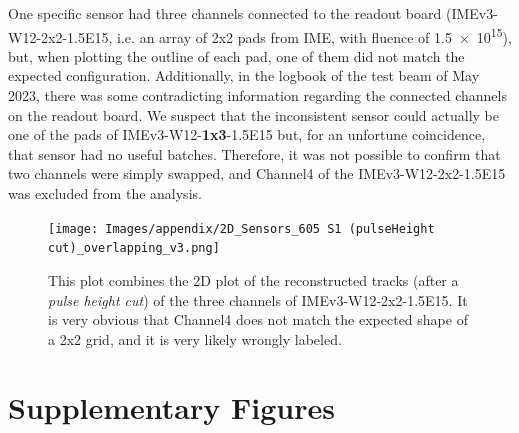 One specific sensor had three channels connected to the readout board (IMEv3-W12-2x2-1.5E15, i.e. an array of 2x2 pads from IME, with fluence of \qty{1.5e15}{\neutroneq}), but, when plotting the outline of each pad, one of them did not match the expected configuration. Additionally, in the logbook of the test beam of May 2023, there was some contradicting information regarding the connected channels on the readout board. We suspect that the inconsistent sensor could actually be one of the pads of IMEv3-W12-\textbf{1x3}-1.5E15 but, for an unfortune coincidence, that sensor had no useful batches. %
Therefore, it was not possible to confirm that two channels were simply swapped, and Channel4 of the IMEv3-W12-2x2-1.5E15 was excluded from the analysis.


\begin{figure}[h!tbp]
    \centering
    \texttt{[image: Images/appendix/2D\_Sensors\_605 S1 (pulseHeight cut)\_overlapping\_v3.png]}
    \caption{This plot combines the 2D plot of the reconstructed tracks (after a \textit{pulse height cut}) of the three channels of IMEv3-W12-2x2-1.5E15. It is very obvious that Channel4 does not match the expected shape of a 2x2 grid, and it is very likely wrongly labeled.}
    \label{fig:mislabeled_sensor}
\end{figure}

\section{Supplementary Figures}\label{sec:additional_plots}

